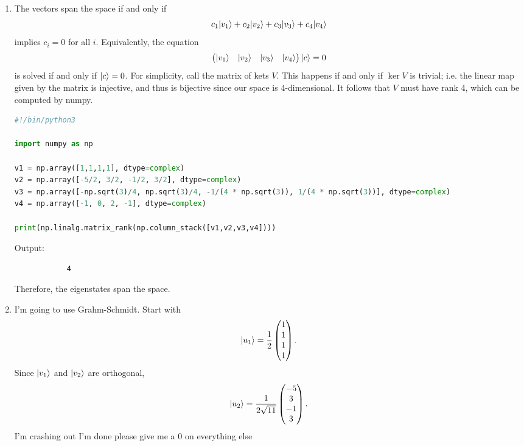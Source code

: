\documentclass[11pt, letterpaper]{article}
\begin{document}
\begin{enumerate}
\begin{lstlisting}[language=Python]
# print evals if it works and print something else if it doesnt
if is_ev(v1):
    print(f"v1: {is_ev(v1)}")
if is_ev(v2):
    print(f"v2: {is_ev(v2)}")
if is_ev(v3):
    print(f"v3: {is_ev(v3)}")
if is_ev(v4):
    print(f"v4: {is_ev(v4)}")
\end{lstlisting}
	Output:
	\begin{lstlisting}
v1: 5.0
v2: 2.0
v3: 2.0
v4: 1.0000000000000004
\end{lstlisting}
	We have that the eigenvalues are
	\[
		v_1=5,\quad v_2=2,\quad v_3=2,\quad v_4=1
	.\]
	The matrix representation in the eigenbasis is then just
	\[
		\begin{pmatrix}
		5 &  &  &  \\
		 & 2 &  &  \\
		 &  & 2 &  \\
		 &  &  & 1
		\end{pmatrix}
	.\]
\item The vectors span the space if and only if
	\[
		c_1 \lvert v_1\rangle +c_2 \lvert v_2\rangle +c_3 \lvert v_3\rangle +c_4 \lvert v_4\rangle 
	\]
	implies $c_i=0$ for all $i$. Equivalently, the equation
		\[
			\begin{pmatrix}
	\lvert v_1\rangle  & \lvert v_2\rangle  & \lvert v_3\rangle  & \lvert v_4\rangle 
	\end{pmatrix}\lvert c\rangle=0
		\]
		is solved if and only if $\lvert c\rangle =0$. For simplicity, call the matrix of kets $V$. This happens if and only if $\ker V$ is trivial; i.e. the linear map given by the matrix is injective, and thus is bijective since our space is 4-dimensional. It follows that $V$ must have rank 4, which can be computed by numpy.
		\begin{lstlisting}[language=Python]		
#!/bin/python3

import numpy as np

v1 = np.array([1,1,1,1], dtype=complex)
v2 = np.array([-5/2, 3/2, -1/2, 3/2], dtype=complex)
v3 = np.array([-np.sqrt(3)/4, np.sqrt(3)/4, -1/(4 * np.sqrt(3)), 1/(4 * np.sqrt(3))], dtype=complex)
v4 = np.array([-1, 0, 2, -1], dtype=complex)

print(np.linalg.matrix_rank(np.column_stack([v1,v2,v3,v4])))
\end{lstlisting}
		Output:
		\begin{lstlisting}
			4\end{lstlisting}
		Therefore, the eigenstates span the space.

\item I'm going to use Grahm-Schmidt. Start with
	\[
		\lvert u_1\rangle =\frac{1}{2} \begin{pmatrix}
		1 \\
		1 \\
		1 \\
		1
		\end{pmatrix}
	.\]
	Since $\lvert v_1\rangle $ and $\lvert v_2\rangle $ are orthogonal,
	\[
		\lvert u_2\rangle =\frac{1}{2\sqrt{11} } \begin{pmatrix}
		-5 \\
		3 \\
		-1 \\
		3
		\end{pmatrix}
	.\]
	I'm crashing out I'm done please give me a 0 on everything else
\end{enumerate}
\end{document}
